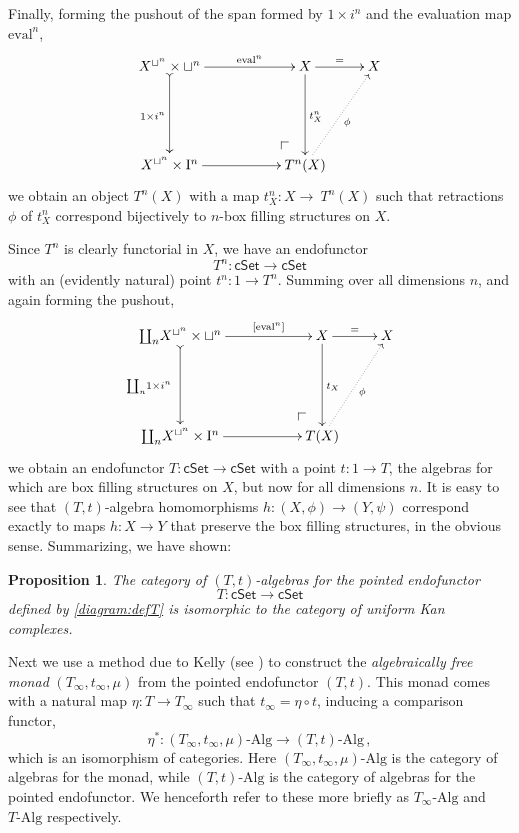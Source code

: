 \documentclass[12pt]{article}
\makeatletter
\newcommand{\cSet}{\ensuremath{\mathsf{cSet}}}
\newcommand{\pocorner}[1][dr]{\save*!/#1+2pc/#1:(2,-2)@^{|-}\restore}
\newcommand{\eval}{\ensuremath{\mathrm{eval}}}
\newcommand{\I}{\ensuremath{\mathrm{I}}}
\newtheorem{proposition}[theorem]{Proposition}
\theoremstyle{remark}
\theoremstyle{definition}
\makeatother
\begin{document}
Finally, forming the pushout of the span formed by $1\times i^n$ and the evaluation map $\eval^n$,
\begin{equation}\label{diagram:defTn}
\xymatrix{
 X^{\sqcup^n}\times\sqcup^n \ar@{>->}[dd]_{1\times i^n} \ar[rr]^-{\eval^n} && X \ar[dd]^{t^n_X} \ar[r]^{=} & X\\
&&& \\
 X^{\sqcup^n}\times\I^n \ar[rr] && {\pocorner} T^n(X) \ar@{..>}[uur]_{\phi} &
}
\end{equation}
we obtain an object $T^n(X)$ with a map $t^n_X : X\to\ T^n(X)$ such that retractions $\phi$ of $t^n_X$ correspond bijectively to $n$-box filling structures on $X$.  

Since $T^n$ is clearly functorial in $X$, we have an endofunctor $$T^n : \cSet\to\cSet$$ with an (evidently natural) point $t^n : 1 \to T^n$.  Summing over all dimensions $n$, and again forming the pushout, 
\begin{equation}\label{diagram:defT}
\xymatrix{
{\coprod_{n}}X^{\sqcup^n}\times\sqcup^n \ar@{>->}[dd]_{{\coprod_{n}}1\times i^n\ } \ar[rr]^-{[\eval^n]} && X \ar[dd]^{t_X} \ar[r]^{=} & X\\
&&& \\
{\coprod_{n}}X^{\sqcup^n}\times\I^n \ar[rr] && {\pocorner} T(X) \ar@{..>}[uur]_{\phi} &
}
\end{equation}
we obtain an endofunctor $T : \cSet \to \cSet$ with a point $t : 1\to T$, 
the algebras for which are box filling structures on $X$, but now for all dimensions $n$.  It is easy to see that $(T,t)$-algebra homomorphisms  $h : (X,\phi) \to (Y, \psi)$ correspond exactly to maps $h : X\to Y$ that preserve the box filling structures, in the obvious sense.  Summarizing, we have shown:
%
\begin{proposition}
The category of $(T,t)$-algebras for the pointed endofunctor $$T : \cSet \to \cSet$$ defined by \eqref{diagram:defT} is isomorphic to the category of uniform Kan complexes.
\end{proposition}
%

Next we use a method due to Kelly (see \cite{Garner,Kelly}) to construct the \emph{algebraically free monad} $(T_\infty, t_\infty, \mu)$ from the pointed endofunctor $(T,t)$.  This monad comes with a natural map $\eta : T\to T_\infty$ such that $t_\infty = \eta\circ t$, inducing a comparison functor, $$\eta^* : (T_\infty, t_\infty, \mu)\mbox{-}\mathrm{Alg} \to (T,t)\mbox{-}\mathrm{Alg}\,,$$ which is an isomorphism of categories.  Here $(T_\infty, t_\infty, \mu)\mbox{-}\mathrm{Alg}$ is the category of algebras for the monad, while $(T,t)\mbox{-}\mathrm{Alg}$ is the category of algebras for the pointed endofunctor.  We henceforth refer to these more briefly as $T_\infty\mbox{-}\mathrm{Alg}$ and $T\mbox{-}\mathrm{Alg}$ respectively.
\end{document}

